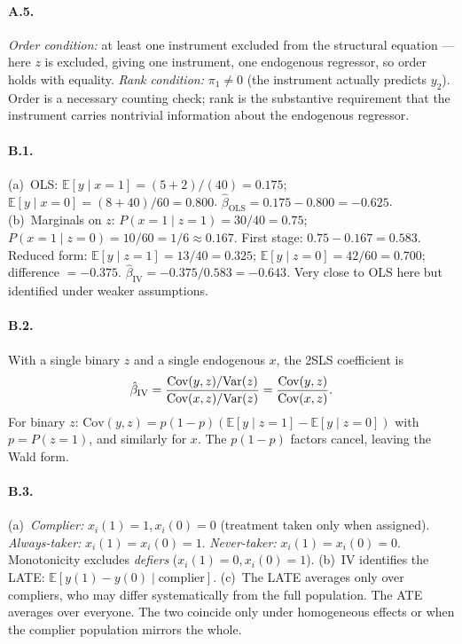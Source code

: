 \documentclass{article}
\newcommand{\E}{\mathbb{E}}
\begin{document}
\paragraph{A.5.}  \emph{Order condition:} at least one instrument excluded from the structural equation --- here $z$ is excluded, giving one instrument, one endogenous regressor, so order holds with equality.  \emph{Rank condition:} $\pi_1 \neq 0$ (the instrument actually predicts $y_2$).  Order is a necessary counting check; rank is the substantive requirement that the instrument carries nontrivial information about the endogenous regressor.

\bigskip

\paragraph{B.1.}  (a)~OLS: $\E[y\mid x=1] = (5+2)/(40) = 0.175$; $\E[y\mid x=0] = (8+40)/60 = 0.800$.  $\hat\beta_{\text{OLS}} = 0.175 - 0.800 = -0.625$.  (b)~Marginals on $z$: $P(x = 1 \mid z=1) = 30/40 = 0.75$; $P(x=1\mid z=0) = 10/60 = 1/6 \approx 0.167$.  First stage: $0.75 - 0.167 = 0.583$.  Reduced form: $\E[y\mid z=1] = 13/40 = 0.325$; $\E[y\mid z=0] = 42/60 = 0.700$; difference $= -0.375$.  $\hat\beta_{\text{IV}} = -0.375/0.583 = -0.643$.  Very close to OLS here but identified under weaker assumptions.

\paragraph{B.2.}  With a single binary $z$ and a single endogenous $x$, the 2SLS coefficient is
$$\hat\beta_{\text{IV}} = \frac{\text{Cov}(y, z)/\mbox{Var}(z)}{\text{Cov}(x, z)/\mbox{Var}(z)} = \frac{\text{Cov}(y,z)}{\text{Cov}(x,z)}.$$
For binary $z$: $\text{Cov}(y,z) = p(1-p)(\E[y\mid z=1] - \E[y\mid z=0])$ with $p = P(z=1)$, and similarly for $x$.  The $p(1-p)$ factors cancel, leaving the Wald form.

\paragraph{B.3.}  (a)~\emph{Complier:} $x_i(1) = 1, x_i(0) = 0$ (treatment taken only when assigned).  \emph{Always-taker:} $x_i(1) = x_i(0) = 1$.  \emph{Never-taker:} $x_i(1) = x_i(0) = 0$.  Monotonicity excludes \emph{defiers} ($x_i(1) = 0, x_i(0) = 1$).  (b)~IV identifies the LATE: $\E[y(1) - y(0) \mid \text{complier}]$.  (c)~The LATE averages only over compliers, who may differ systematically from the full population.  The ATE averages over everyone.  The two coincide only under homogeneous effects or when the complier population mirrors the whole.
\end{document}
